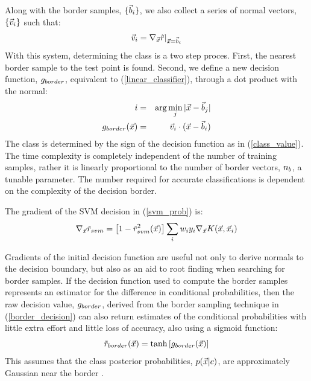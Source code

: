 Along with the border samples,  $\lbrace \vec b_i \rbrace$, we also
collect a series of normal vectors, $\lbrace \vec v_i \rbrace$
such that:
\begin{equation}
\vec v_i=\nabla_{\vec {x}}{\tilde r |_{\vec {x}=\vec b_i}}
\end{equation}
With this system, determining the class is a two step proces.
First, the nearest border sample to the test point is found.
Second, we define a new decision function, $g_{border}$, 
equivalent to (\ref{linear_classifier}), through a dot product with the normal:
\begin{eqnarray}
	i & = & \arg \min_j |\vec {x} - \vec b_j| \\ \nonumber
	g_{border}(\vec {x}) & = & \vec v_i \cdot (\vec {x} - \vec b_i)
	\label{border_decision}
\end{eqnarray}
The class is determined by the sign of the decision function as in 
(\ref{class_value}).
The time complexity is completely independent of the number
of training samples, rather it is linearly proportional to the number of
border vectors, $n_b$, a tunable parameter. The number required for
accurate classifications is dependent on the complexity of the decision
border.

The gradient of the SVM decision in (\ref{svm_prob}) is:
\begin{equation*}
	\nabla_{\vec {x}} {\tilde r_{svm}} = \left [1 - \tilde r_{svm}^2(\vec {x}) \right ] \sum_i w_i y_i \nabla_{\vec {x}} K(\vec {x}, \vec {x}_i)
\end{equation*}

Gradients of the initial decision function are useful not only to derive normals to
the decision boundary, but also as an aid to root finding when searching for
border samples. If the decision function used to compute the border samples
represents an estimator for the
difference in conditional probabilities, then the raw decision value,
$g_{border}$,
derived from the border sampling technique in (\ref{border_decision})
can also return estimates of the conditional probabilities with little
extra effort and little loss of accuracy, also using a sigmoid function:
\begin{equation}
	\tilde r_{border}(\vec {x}) = \tanh \left [g_{border} (\vec {x}) \right ]
	\label{border_probability}
\end{equation}
This assumes that the class posterior probabilities,
$p(\vec {x} | c)$, are approximately Gaussian near the border
\citep{Mills2011}.

